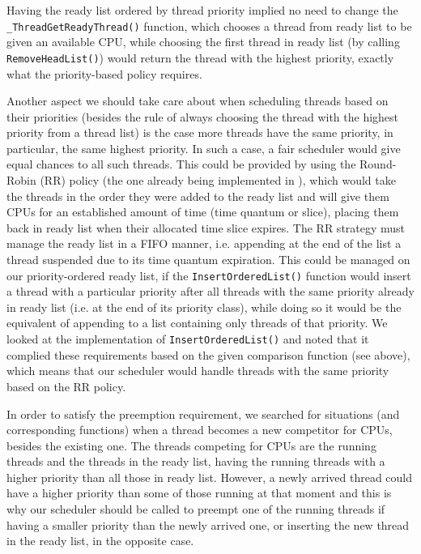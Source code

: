 Having the ready list ordered by thread priority implied no need to change the \lstinline|_ThreadGetReadyThread()| function, which chooses a thread from ready list to be given an available CPU, while choosing the first thread in ready list (by calling \lstinline|RemoveHeadList()|) would return the thread with the highest priority, exactly what the priority-based policy requires. 

Another aspect we should take care about when scheduling threads based on their priorities (besides the rule of always choosing the thread with the highest priority from a thread list) is the case more threads have the same priority, in particular, the same highest priority. In such a case, a fair scheduler would give equal chances to all such threads. This could be provided by using the Round-Robin (RR) policy (the one already being implemented in \OSName{}), which would take the threads in the order they were added to the ready list and will give them CPUs for an established amount of time (time quantum or slice), placing them back in ready list when their allocated time slice expires. The RR strategy must manage the ready list in a FIFO manner, i.e. appending at the end of the list a thread suspended due to its time quantum expiration. This could be managed on our priority-ordered ready list, if the \lstinline|InsertOrderedList()| function would insert a thread with a particular priority after all threads with the same priority already in ready list (i.e. at the end of its priority class), while doing so it would be the equivalent of appending to a list containing only threads of that priority. We looked at the implementation of \lstinline|InsertOrderedList()| and noted that it complied these requirements based on the given comparison function (see above), which means that our scheduler would handle threads with the same priority based on the RR policy. 

In order to satisfy the preemption requirement, we searched for situations (and corresponding functions) when a thread becomes a new competitor for CPUs, besides the existing one. The threads competing for CPUs are the running threads and the threads in the ready list, having the running threads with a higher priority than all those in ready list. However, a newly arrived thread could have a higher priority than some of those running at that moment and this is why our scheduler should be called to preempt one of the running threads if having a smaller priority than the newly arrived one, or inserting the new thread in the ready list, in the opposite case. 

